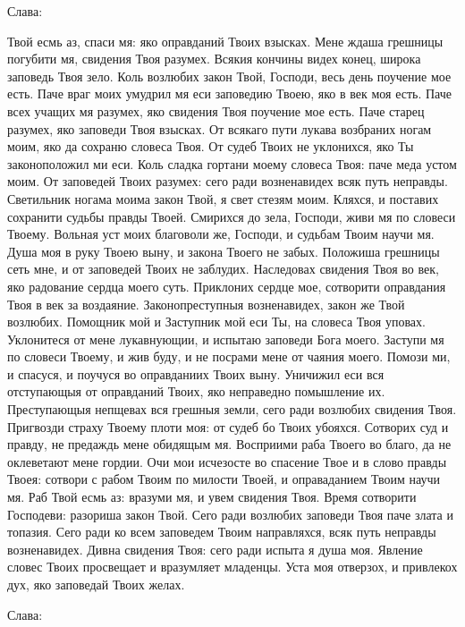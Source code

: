 \begin{mymulticols}
Слава: 

Твой есмь аз, спаси мя: яко оправданий Твоих взысках. Мене ждаша грешницы погубити мя, свидения Твоя разумех. Всякия кончины видех конец, широка заповедь Твоя зело. Коль возлюбих закон Твой, Господи, весь день поучение мое есть. Паче враг моих умудрил мя еси заповедию Твоею, яко в век моя есть. Паче всех учащих мя разумех, яко свидения Твоя поучение мое есть. Паче старец разумех, яко заповеди Твоя взысках. От всякаго пути лукава возбраних ногам моим, яко да сохраню словеса Твоя. От судеб Твоих не уклонихся, яко Ты законоположил ми еси. Коль сладка гортани моему словеса Твоя: паче меда устом моим. От заповедей Твоих разумех: сего ради возненавидех всяк путь неправды. Светильник ногама моима закон Твой, я свет стезям моим. Кляхся, и поставих сохранити судьбы правды Твоей. Смирихся до зела, Господи, живи мя по словеси Твоему. Вольная уст моих благоволи же, Господи, и судьбам Твоим научи мя. Душа моя в руку Твоею выну, и закона Твоего не забых. Положиша грешницы сеть мне, и от заповедей Твоих не заблудих. Наследовах свидения Твоя во век, яко радование сердца моего суть. Приклоних сердце мое, сотворити оправдания Твоя в век за воздаяние. Законопреступныя возненавидех, закон же Твой возлюбих. Помощник мой и Заступник мой еси Ты, на словеса Твоя уповах. Уклонитеся от мене лукавнующии, и испытаю заповеди Бога моего. Заступи мя по словеси Твоему, и жив буду, и не посрами мене от чаяния моего. Помози ми, и спасуся, и поучуся во оправданиих Твоих выну. Уничижил еси вся отступающыя от оправданий Твоих, яко неправедно помышление их. Преступающыя непщевах вся грешныя земли, сего ради возлюбих свидения Твоя. Пригвозди страху Твоему плоти моя: от судеб бо Твоих убояхся. Сотворих суд и правду, не предаждь мене обидящым мя. Восприими раба Твоего во благо, да не оклеветают мене гордии. Очи мои исчезосте во спасение Твое и в слово правды Твоея: сотвори с рабом Твоим по милости Твоей, и оправаданием Твоим научи мя. Раб Твой есмь аз: вразуми мя, и увем свидения Твоя. Время сотворити Господеви: разориша закон Твой. Сего ради возлюбих заповеди Твоя паче злата и топазия. Сего ради ко всем заповедем Твоим направляхся, всяк путь неправды возненавидех. Дивна свидения Твоя: сего ради испыта я душа моя. Явление словес Твоих просвещает и вразумляет младенцы. Уста моя отверзох, и привлекох дух, яко заповедай Твоих желах. 

Слава: 


\end{mymulticols}
